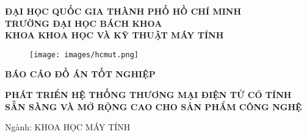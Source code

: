 \begin{titlepage}

    \begingroup
        \fontsize{15pt}{12pt}\selectfont
        \begin{center}
            \textbf{
                ĐẠI HỌC QUỐC GIA THÀNH PHỐ HỒ CHÍ MINH \\
                TRƯỜNG ĐẠI HỌC BÁCH KHOA \\
                KHOA KHOA HỌC VÀ KỸ THUẬT MÁY TÍNH
            }
        \end{center}       
    \endgroup
    
    \vspace{1cm}
    
    \begin{figure}[h!]
        \begin{center}
            \texttt{[image: images/hcmut.png]}
        \end{center}
    \end{figure}
    
    \vspace{0.5cm}

    \begingroup
        \fontsize{15pt}{12pt}\selectfont
        \begin{center}
            \textbf{BÁO CÁO ĐỒ ÁN TỐT NGHIỆP}
        \end{center}       
    \endgroup

    \vspace{0.5cm}


    \begingroup
        \fontsize{18pt}{12pt}\selectfont
        \begin{center}
            \textbf{PHÁT TRIỂN HỆ THỐNG THƯƠNG MẠI ĐIỆN TỬ CÓ TÍNH SẴN SÀNG VÀ MỞ RỘNG CAO CHO SẢN PHẨM CÔNG NGHỆ}
        \end{center}       
    \endgroup

    \vspace{0.5cm}

    \begingroup
        \fontsize{15pt}{12pt}\selectfont
        \begin{center}
            Ngành: KHOA HỌC MÁY TÍNH
        \end{center}       
    \endgroup
    
    \vspace{1cm}


\end{titlepage}
